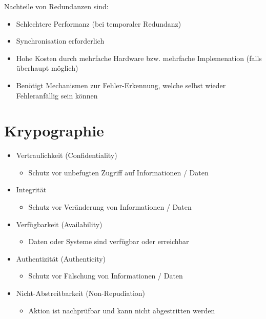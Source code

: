 \documentclass[a4paper,12pt]{article}
\begin{document}
Nachteile von Redundanzen sind:
\begin{itemize}
\item Schlechtere Performanz (bei temporaler Redundanz)
\item Synchronisation erforderlich
\item Hohe Kosten durch mehrfache Hardware bzw. mehrfache Implemenation (falls überhaupt möglich)
\item Benötigt Mechanismen zur Fehler-Erkennung, welche selbst wieder Fehleranfällig sein können
\end{itemize}

\section{Krypographie}
\begin{itemize}
\label{item:schutzziele}
\item Vertraulichkeit (Confidentiality)
	\begin{itemize}
	\item Schutz vor unbefugten Zugriff auf Informationen / Daten
	\end{itemize}
\item Integrität
	\begin{itemize}
	\item Schutz vor Veränderung von Informationen / Daten
	\end{itemize}
\item Verfügbarkeit (Availability)
	\begin{itemize}
	\item Daten oder Systeme sind verfügbar oder erreichbar
	\end{itemize}
\item Authentizität (Authenticity)
	\begin{itemize}
	\item Schutz vor Fälschung von Informationen / Daten
	\end{itemize}
\item Nicht-Abstreitbarkeit (Non-Repudiation)
	\begin{itemize}
	\item Aktion ist nachprüfbar und kann nicht abgestritten werden
	\end{itemize}
\end{itemize}
\end{document}
